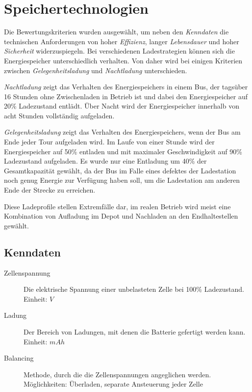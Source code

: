 \documentclass{scrartcl}
\begin{document}
\section{Speichertechnologien}
Die Bewertungskriterien wurden ausgewählt, um neben den \emph{Kenndaten} die technischen Anforderungen von hoher \emph{Effizienz}, langer \emph{Lebensdauer} und hoher \emph{Sicherheit} widerzuspiegeln. Bei verschiedenen Ladestrategien können sich die Energiespeicher unterschiedlich verhalten. Von daher wird bei einigen Kriterien zwischen \emph{Gelegenheitsladung} und \emph{Nachtladung} unterschieden.

\emph{Nachtladung} zeigt das Verhalten des Energiespeichers in einem Bus, der tagsüber 16 Stunden ohne Zwischenladen in Betrieb ist und dabei den Energiespeicher auf 20\% Ladezustand entlädt. Über Nacht wird der Energiespeicher innerhalb von acht Stunden vollständig aufgeladen.

\emph{Gelegenheitsladung} zeigt das Verhalten des Energiespeichers, wenn der Bus am Ende jeder Tour aufgeladen wird. Im Laufe von einer Stunde wird der Energiespeicher auf 50\% entladen und mit maximaler Geschwindigkeit auf 90\% Ladezustand aufgeladen. Es wurde nur eine Entladung um 40\% der Gesamtkapazität gewählt, da der Bus im Falle eines defektes der Ladestation noch genug Energie zur Verfügung haben soll, um die Ladestation am anderen Ende der Strecke zu erreichen.

Diese Ladeprofile stellen Extremfälle dar, im realen Betrieb wird meist eine Kombination von Aufladung im Depot und Nachladen an den Endhaltestellen gewählt. 

\subsection{Kenndaten}

\begin{description}
	\item[Zellenspannung] Die elektrische Spannung einer unbelasteten Zelle bei 100\% Ladezustand.\\
	Einheit: $V$
	\item[Ladung] Der Bereich von Ladungen, mit denen die Batterie gefertigt werden kann.\\
	Einheit: $mAh$
	\item[Balancing] Methode, durch die die Zellenspannungen angeglichen werden.\\
	Möglichkeiten: Überladen, separate Ansteuerung jeder Zelle
\end{description}
\end{document}
